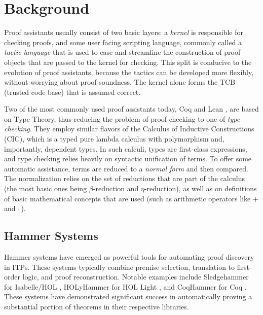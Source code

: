 \section{Background}
\label{lweqsat:background}

Proof assistants usually consist of two basic layers: a \emph{kernel} is responsible for checking proofs, and some user facing scripting language, commonly called a \emph{tactic language} that is used to ease and streamline the construction of proof objects that are passed to the kernel for checking.
This split is conducive to the evolution of proof assistants, because the tactics can be developed more flexibly, without worrying about proof soundness.
The kernel alone forms the TCB (trusted code base) that is assumed correct.

Two of the most commonly used proof assistants today, Coq and Lean , are based on Type Theory, thus reducing the problem of proof checking to one of \emph{type checking}.
They employ similar flavors of the Calculus of Inductive Constructions (CIC), which is a typed pure lambda calculus with polymorphism and, importantly, dependent types.
In such calculi, types are first-class expressions, and 
type checking relies heavily on syntactic unification of terms.
To offer some automatic assistance, terms are reduced to a \emph{normal form} and then compared.
The normalization relies on the set of reductions that are part of the calculus (the most basic ones being $\beta$-reduction and $\eta$-reduction),
as well as on definitions of basic mathematical concepts that are used (such as arithmetic operators like $+$ and $\cdot\,$).


\subsection{Hammer Systems}

Hammer systems have emerged as powerful tools for automating proof discovery in ITPs. These systems typically combine premise selection, translation to first-order logic, and proof reconstruction. Notable examples include Sledgehammer for Isabelle/HOL \cite{sledgehammer}, HOLyHammer for HOL Light \cite{holyhammer}, and CoqHammer for Coq \cite{coqhammer}. These systems have demonstrated significant success in automatically proving a substantial portion of theorems in their respective libraries.

